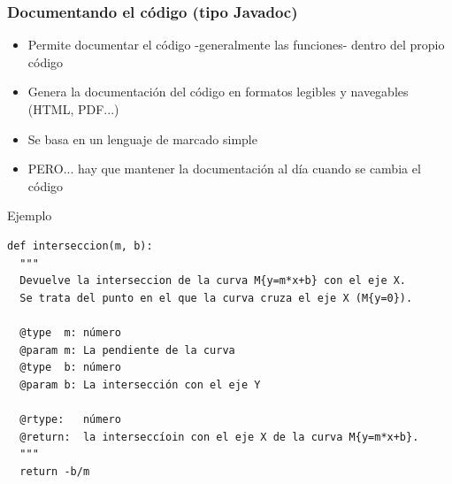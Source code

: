 \begin{frame}
\frametitle{Documentando el código (tipo Javadoc)}

\begin{small}
\begin{itemize}
\item Permite documentar el código -generalmente las funciones- dentro del propio código
\item Genera la documentación del código en formatos legibles y navegables
(HTML, PDF...)
\item Se basa en un lenguaje de marcado simple
\item PERO... hay que mantener la documentación al día cuando se cambia
el código
\end{itemize}
\end{small}
\end{frame}

\begin{frame}[fragile]
Ejemplo

\begin{small}
\begin{verbatim}
def interseccion(m, b):
  """
  Devuelve la interseccion de la curva M{y=m*x+b} con el eje X. 
  Se trata del punto en el que la curva cruza el eje X (M{y=0}).

  @type  m: número
  @param m: La pendiente de la curva
  @type  b: número
  @param b: La intersección con el eje Y

  @rtype:   número
  @return:  la interseccíoin con el eje X de la curva M{y=m*x+b}.
  """
  return -b/m
\end{verbatim}
\end{small}
  
\end{frame}



